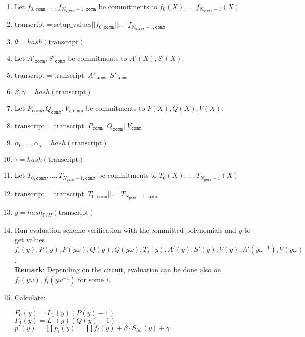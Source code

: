 \begin{enumerate}
    \item Let $f_{0, \texttt{comm}}, \dots, f_{N_{\texttt{wires}} - 1, \texttt{comm}}$ be commitments to $f_{0}(X), \dots, f_{N_{\texttt{wires}} - 1}(X)$
    \item $\text{transcript} = \text{setup\_values} || f_{0, \texttt{comm}} || \dots || f_{N_{\texttt{wires}} - 1, \texttt{comm}}$
    \item $\theta = hash(\text{transcript})$
    \item Let $A'_{\texttt{comm}}, S'_{\texttt{comm}}$ be commitments to $A'(X), S'(X)$.
    \item $\text{transcript} = \text{transcript} || A'_{\texttt{comm}} || S'_{\texttt{comm}}$ 
    \item $\beta, \gamma = hash(\text{transcript})$
    \item Let $P_{\texttt{comm}}, Q_{\texttt{comm}}, V_{i, \texttt{comm}}$ be commitments to $P(X), Q(X), V(X)$.
    \item $\text{transcript} = \text{transcript} || P_{\texttt{comm}} || Q_{\texttt{comm}} || V_{\texttt{comm}}$
    \item $\alpha_0, \dots, \alpha_5 = hash(\text{transcript})$
    \item $\tau = hash(\text{transcript})$
    \item Let $T_{0, \texttt{comm}}, ..., T_{N_{\texttt{perm}} - 1, \texttt{comm}}$ be commitments to $T_0(X), ..., T_{N_{\texttt{perm}} - 1}(X)$ 
    \item $\text{transcript} = \text{transcript} || T_{0, \texttt{comm}} || ... || T_{N_{\texttt{perm}} - 1, \texttt{comm}}$
    \item $y = hash_{\mathbb{F}/H}(\text{transcript})$
    \item Run evaluation scheme verification with the committed polynomials and $y$ to get values 
        $f_i(y), P(y), P(y\omega), Q(y), Q(y\omega), T_j(y), A'(y), S'(y), V(y), A'(y\omega^{-1}), V(y\omega)$.  \\
        \textbf{Remark}: Depending on the circuit, evaluation can be done also on $f_i(y\omega), f_i(y\omega^{-1})$ for some $i$.
    \item Calculate:
        \begin{center}
            $F_0(y) = L_1(y)(P(y) - 1)$ \\
            $F_1(y) = L_1(y)(Q(y) - 1)$ \\
            $p'(y) = \prod p_i(y) = \prod f_i(y) + \beta \cdot S_{id_i}(y) + \gamma$ \\

\end{center}
\end{enumerate}
